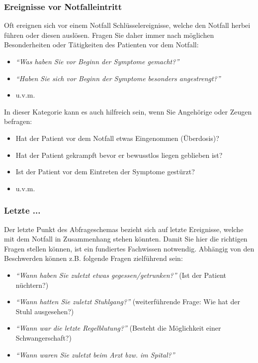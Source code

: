 \subsubsection{Ereignisse vor Notfalleintritt}
Oft ereignen sich vor einem Notfall Schlüsselereignisse, welche den Notfall herbei führen oder diesen auslösen. Fragen Sie daher immer nach möglichen Besonderheiten oder Tätigkeiten des Patienten vor dem Notfall:
\begin{itemize}
    \item \emph{"`Was haben Sie vor Beginn der Symptome
    gemacht?"'}
    \item \emph{"`Haben Sie sich vor Beginn der Symptome
    besonders angestrengt?"'}
    \item u.v.m.
\end{itemize}
In dieser Kategorie kann es auch hilfreich sein, wenn Sie Angehörige oder Zeugen befragen:
\begin{itemize}
    \item Hat der Patient vor dem Notfall etwas Eingenommen (Überdosis)?
    \item Hat der Patient gekrampft bevor er bewusstlos liegen geblieben ist?
    \item Ist der Patient vor dem Eintreten der Symptome gestürzt?
    \item u.v.m.
\end{itemize}

\subsubsection{Letzte ...}
Der letzte Punkt des Abfrageschemas bezieht sich auf letzte Ereignisse, welche mit dem Notfall in Zusammenhang stehen könnten. Damit Sie hier die richtigen Fragen stellen können, ist ein fundiertes Fachwissen notwendig. Abhängig von den Beschwerden können z.B. folgende Fragen zielführend sein:
\begin{itemize}
    \item \emph{"`Wann haben Sie zuletzt etwas
    gegessen/getrunken?"'} (Ist der Patient nüchtern?)
    \item \emph{"`Wann hatten Sie zuletzt Stuhlgang?"'}
    (weiterführende Frage: Wie hat der Stuhl ausgesehen?)
    \item \emph{"`Wann war die letzte Regelblutung?"'}
    (Besteht die Möglichkeit einer Schwangerschaft?)
    \item \emph{"`Wann waren Sie zuletzt beim Arzt bzw. im
    Spital?"'}
\end{itemize}

